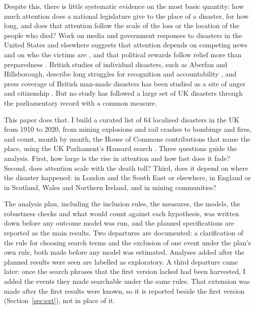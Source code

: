 \documentclass[11pt,a4paper]{article}
\begin{document}
Despite this, there is little systematic evidence on the most basic quantity: how much attention does a national legislature give to the place of a disaster, for how long, and does that attention follow the scale of the loss or the location of the people who died? Work on media and government responses to disasters in the United States and elsewhere suggests that attention depends on competing news and on who the victims are \citep{EisenseeStromberg2007,Stromberg2007}, and that political rewards follow relief more than preparedness \citep{HealyMalhotra2009,GarrettSobel2003}. British studies of individual disasters, such as Aberfan and Hillsborough, describe long struggles for recognition and accountability \citep{McLeanJohnes2000,Johnes2000,Scraton1999}, and press coverage of British man-made disasters has been studied as a site of anger and citizenship \citep{PanttiWahlJorgensen2011}. But no study has followed a large set of UK disasters through the parliamentary record with a common measure.

This paper does that. I build a curated list of 64 localised disasters in the UK from 1910 to 2020, from mining explosions and rail crashes to bombings and fires, and count, month by month, the House of Commons contributions that name the place, using the UK Parliament's Hansard search \citep{Hansard2026}. Three questions guide the analysis. First, how large is the rise in attention and how fast does it fade? Second, does attention scale with the death toll? Third, does it depend on where the disaster happened: in London and the South East or elsewhere, in England or in Scotland, Wales and Northern Ireland, and in mining communities?

The analysis plan, including the inclusion rules, the measures, the models, the robustness checks and what would count against each hypothesis, was written down before any outcome model was run, and the planned specifications are reported as the main results. Two departures are documented: a clarification of the rule for choosing search terms and the exclusion of one event under the plan's own rule, both made before any model was estimated. Analyses added after the planned results were seen are labelled as exploratory. A third departure came later: once the search phrases that the first version lacked had been harvested, I added the events they made searchable under the same rules. That extension was made after the first results were known, so it is reported beside the first version (Section~\ref{sec:ext}), not in place of it.
\end{document}
